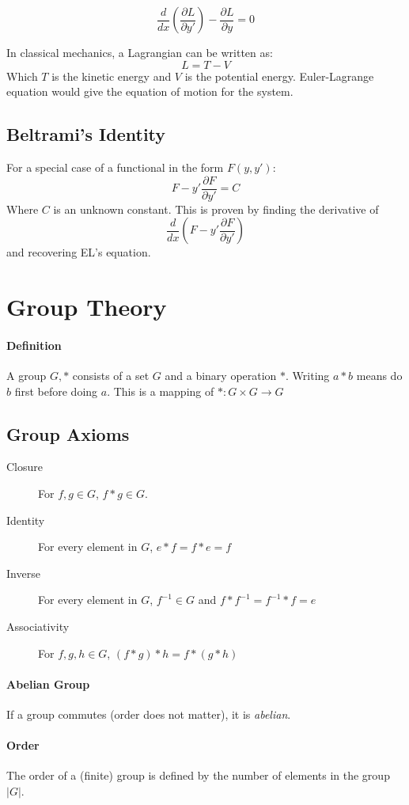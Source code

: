 \documentclass[12pt]{article}
\begin{document}
\[ \frac{d}{dx}\left(\frac{\partial L}{\partial y'} \right) -\frac{\partial L}{\partial y} = 0\]

In classical mechanics, a Lagrangian can be written as:
\[ L = T -V\]
Which $T$ is the kinetic energy and $V$ is the potential energy. Euler-Lagrange equation would give the equation of motion for the system.

\subsection{Beltrami's Identity}
For a special case of a functional in the form $F(y,y')$:
\[ F - y'\frac{\partial F}{\partial y'} = C\]
Where $C$ is an unknown constant. This is proven by finding the derivative of \[ \frac{d}{dx}\left(F - y'\frac{\partial F}{\partial y'}\right)\] and recovering EL's equation. 


\section{Group Theory}

\paragraph{Definition}
A group ${G,*}$ consists of a set $G$ and a binary operation $*$. Writing $a*b$ means do $b$ first before doing $a$. This is a mapping of $*:G\times G\to G$
\subsection{Group Axioms}
\begin{description}
\item [Closure] For $f,g \in G$, $f*g \in G$.
\item [Identity] For every element in $G$, $e * f = f* e = f$
\item [Inverse] For every element in $G$, $f^{-1} \in G$ and $f*f^{-1} = f^{-1}*f =e$
\item [Associativity] For $f,g,h\in G$, \(
(f * g)*h = f*(g*h)\)
\end{description}

\paragraph{Abelian Group} If a group commutes (order does not matter), it is \textit{abelian}.

\paragraph{Order} The order of a (finite) group is defined by the number of elements in the group $|G|$. 
\end{document}
